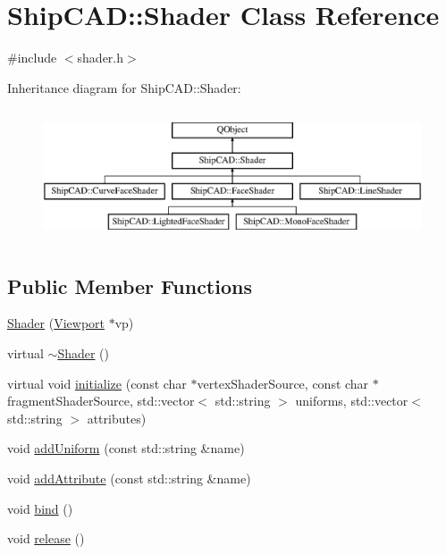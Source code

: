 \hypertarget{classShipCAD_1_1Shader}{}\section{Ship\+C\+AD\+:\+:Shader Class Reference}
\label{classShipCAD_1_1Shader}


{\ttfamily \#include $<$shader.\+h$>$}

Inheritance diagram for Ship\+C\+AD\+:\+:Shader\+:\begin{figure}[H]
\begin{center}
\leavevmode
\includegraphics[height=3.950617cm]{classShipCAD_1_1Shader}
\end{center}
\end{figure}
\subsection*{Public Member Functions}
\begin{DoxyCompactItemize}
\item 
\hyperlink{classShipCAD_1_1Shader_a36bc24054e22fb965b04dae9a2b76eb7}{Shader} (\hyperlink{classShipCAD_1_1Viewport}{Viewport} $\ast$vp)
\item 
virtual \hyperlink{classShipCAD_1_1Shader_aff01df87e8a102f270b5b135a295e59d}{$\sim$\+Shader} ()
\item 
virtual void \hyperlink{classShipCAD_1_1Shader_a011fae279e362f548e8c4e4b35b7291e}{initialize} (const char $\ast$vertex\+Shader\+Source, const char $\ast$fragment\+Shader\+Source, std\+::vector$<$ std\+::string $>$ uniforms, std\+::vector$<$ std\+::string $>$ attributes)
\item 
void \hyperlink{classShipCAD_1_1Shader_ac8faec958f9d5806510d39be5f512c8e}{add\+Uniform} (const std\+::string \&name)
\item 
void \hyperlink{classShipCAD_1_1Shader_a6a298be357d7860d859aedbe397b81b9}{add\+Attribute} (const std\+::string \&name)
\item 
void \hyperlink{classShipCAD_1_1Shader_a00c06ead1e413d5d5ecbced82478f753}{bind} ()
\item 
void \hyperlink{classShipCAD_1_1Shader_a0f41d7628964320846101cf5938a928e}{release} ()
\end{DoxyCompactItemize}
